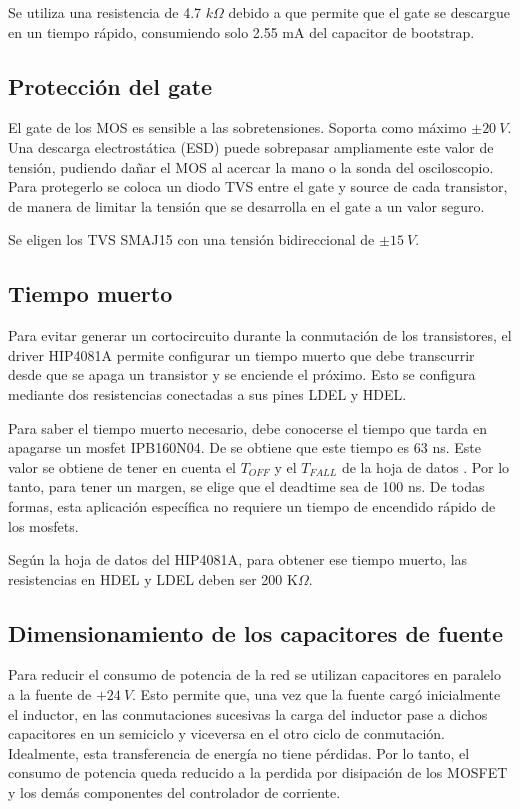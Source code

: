 \noindent Se utiliza una resistencia de 4.7 $k\Omega$ debido a que permite que el gate se descargue en un tiempo rápido, consumiendo solo 2.55 mA del capacitor de bootstrap.

\subsection{Protección del gate}

\noindent El gate de los MOS es sensible a las sobretensiones. Soporta como máximo $\pm 20\:V$. Una descarga electrostática (ESD) puede sobrepasar ampliamente este valor de tensión, pudiendo dañar el MOS al acercar la mano o la sonda del osciloscopio. Para protegerlo se coloca un diodo TVS entre el gate y source de cada transistor, de manera de limitar la tensión que se desarrolla en el gate a un valor seguro.

\noindent Se eligen los TVS SMAJ15 con una tensión bidireccional de $\pm 15\:V$.

\subsection{Tiempo muerto}

\noindent Para evitar generar un cortocircuito durante la conmutación de los transistores, el driver HIP4081A permite configurar un tiempo muerto que debe transcurrir desde que se apaga un transistor y se enciende el próximo. Esto se configura mediante dos resistencias conectadas a sus pines LDEL y HDEL.

\noindent Para saber el tiempo muerto necesario, debe conocerse el tiempo que tarda en apagarse un mosfet IPB160N04. De \cite{IPB160N04} se obtiene que este tiempo es 63 ns. Este valor se obtiene de tener en cuenta el $T_{OFF}$ y el $T_{FALL}$ de la hoja de datos . Por lo tanto, para tener un margen, se elige que el deadtime sea de 100 ns. De todas formas, esta aplicación específica no requiere un tiempo de encendido rápido de los mosfets.

\noindent Según la hoja de datos del HIP4081A\cite{HIP4081A_AN9405}, para obtener ese tiempo muerto, las resistencias en HDEL y LDEL deben ser 200 K$\Omega$.

\subsection{Dimensionamiento de los capacitores de fuente}
	
\noindent Para reducir el consumo de potencia de la red se utilizan capacitores en paralelo a la fuente de $+24\:V$. Esto permite que, una vez que la fuente cargó inicialmente el inductor, en las conmutaciones sucesivas la carga del inductor pase a dichos capacitores en un semiciclo y viceversa en el otro ciclo de conmutación. Idealmente, esta transferencia de energía no tiene pérdidas. Por lo tanto, el consumo de potencia queda reducido a la perdida por disipación de los MOSFET y los demás componentes del controlador de corriente. 

